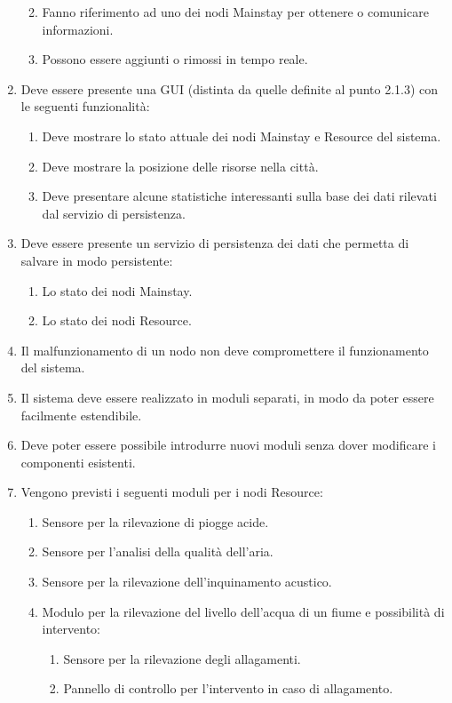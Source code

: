 \documentclass[12pt]{article}
\begin{document}
\begin{enumerate}
\begin{enumerate}
\begin{enumerate}
        \end{enumerate}
        \item Fanno riferimento ad uno dei nodi Mainstay per ottenere o comunicare informazioni.
        \item Possono essere aggiunti o rimossi in tempo reale.
    \end{enumerate}
    \item Deve essere presente una GUI (distinta da quelle definite al punto 2.1.3) con le seguenti funzionalità:
    \begin{enumerate}
        \item Deve mostrare lo stato attuale dei nodi Mainstay e Resource del sistema.
        \item Deve mostrare la posizione delle risorse nella città.
        \item Deve presentare alcune statistiche interessanti sulla base dei dati rilevati dal servizio di persistenza.
    \end{enumerate}
    \item Deve essere presente un servizio di persistenza dei dati che permetta di salvare in modo persistente:
    \begin{enumerate}
        \item Lo stato dei nodi Mainstay.
        \item Lo stato dei nodi Resource.
    \end{enumerate}
    \item Il malfunzionamento di un nodo non deve compromettere il funzionamento del sistema.
    \item Il sistema deve essere realizzato in moduli separati, in modo da poter essere facilmente estendibile.
    \item Deve poter essere possibile introdurre nuovi moduli senza dover modificare i componenti esistenti.
    \item Vengono previsti i seguenti moduli per i nodi Resource:
    \begin{enumerate}
        \item Sensore per la rilevazione di piogge acide.
        \item Sensore per l'analisi della qualità dell'aria.
        \item Sensore per la rilevazione dell'inquinamento acustico.
        \item Modulo per la rilevazione del livello dell'acqua di un fiume e possibilità di intervento:
        \begin{enumerate}
            \item Sensore per la rilevazione degli allagamenti.
            \item Pannello di controllo per l'intervento in caso di allagamento.
        \end{enumerate}
    \end{enumerate}
\end{enumerate}
\end{document}
